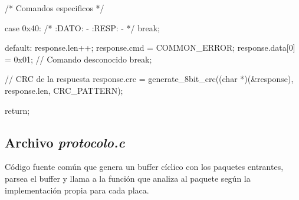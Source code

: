 {\begin{verbatimtab}
{{		/* Comandos especificos */

 		case 0x40:
			/* 
			:DATO:
			-
			:RESP:
			-
			*/
		break;

		default:
			response.len++;
			response.cmd = COMMON_ERROR;
			response.data[0] = 0x01; // Comando desconocido
		break;
	}	

	// CRC de la respuesta
	response.crc = generate_8bit_crc((char *)(&response), response.len, CRC_PATTERN);

	return;
}
\end{verbatimtab}
}

\subsection{Archivo \emph{protocolo.c}}
\label{hA_source_protocolo}

C\'odigo fuente com\'un que genera un buffer c\'iclico con los paquetes entrantes, parsea el
buffer y llama a la funci\'on que analiza al paquete seg\'un la implementaci\'on propia para
cada placa.

